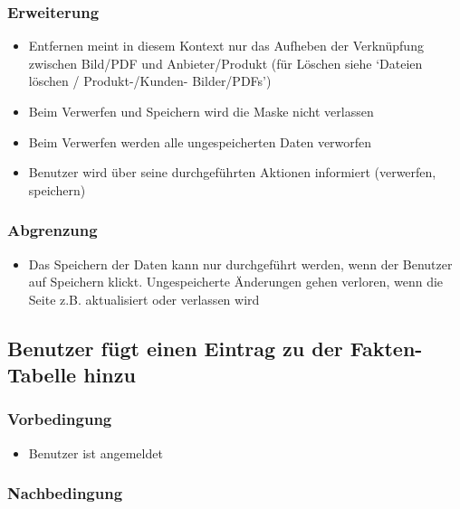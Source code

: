 \documentclass[a4paper,12pt]{article}
\begin{document}
\subsubsection{Erweiterung}\label{erweiterung-7}

\begin{itemize}

\item
  Entfernen meint in diesem Kontext nur das Aufheben der Verknüpfung
  zwischen Bild/PDF und Anbieter/Produkt (für Löschen siehe `Dateien
  löschen / Produkt-/Kunden- Bilder/PDFs')
\item
  Beim Verwerfen und Speichern wird die Maske nicht verlassen
\item
  Beim Verwerfen werden alle ungespeicherten Daten verworfen
\item
  Benutzer wird über seine durchgeführten Aktionen informiert
  (verwerfen, speichern)
\end{itemize}

\subsubsection{Abgrenzung}\label{abgrenzung-7}

\begin{itemize}

\item
  Das Speichern der Daten kann nur durchgeführt werden, wenn der
  Benutzer auf Speichern klickt. Ungespeicherte Änderungen gehen
  verloren, wenn die Seite z.B. aktualisiert oder verlassen wird
\end{itemize}

\subsection{Benutzer fügt einen Eintrag zu der Fakten-Tabelle hinzu}\label{benutzer-fugt-einen-eintrag-zu-der-fakten-tabelle-hinzu}

\subsubsection{Vorbedingung}\label{vorbedingung-8}

\begin{itemize}

\item
  Benutzer ist angemeldet
\end{itemize}

\subsubsection{Nachbedingung}\label{nachbedingung-8}
\end{document}

